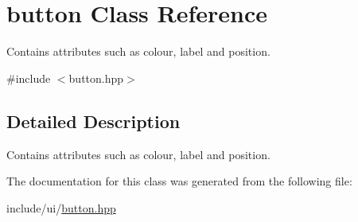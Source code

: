 \hypertarget{classbutton}{\section{button Class Reference}
\label{classbutton}
}


Contains attributes such as colour, label and position.  




{\ttfamily \#include $<$button.\-hpp$>$}



\subsection{Detailed Description}
Contains attributes such as colour, label and position. 

The documentation for this class was generated from the following file\-:\begin{DoxyCompactItemize}
\item 
include/ui/\hyperlink{button_8hpp}{button.\-hpp}\end{DoxyCompactItemize}
